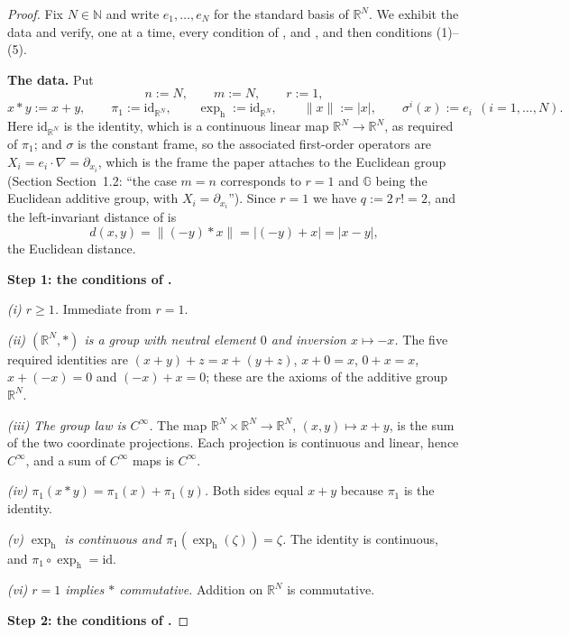 \begin{proof}
Fix $N\in\mathbb N$ and write $e_1,\ldots,e_N$ for the standard basis of $\mathbb R^N$. We
exhibit the data and verify, one at a time, every condition of ,
 and , and then conditions (1)--(5).

\medskip\noindent\textbf{The data.} Put
\[
 n:=N,\qquad m:=N,\qquad r:=1,
\]
\[
 x*y:=x+y,\qquad \pi_1:=\mathrm{id}_{\mathbb R^N},\qquad
 \exp_{\mathrm h}:=\mathrm{id}_{\mathbb R^N},\qquad \|x\|:=|x|,\qquad
 \sigma^i(x):=e_i\ \ (i=1,\ldots,N).
\]
Here $\mathrm{id}_{\mathbb R^N}$ is the identity, which is a continuous linear map
$\mathbb R^N\to\mathbb R^N$, as required of $\pi_1$; and $\sigma$ is the constant frame, so
the associated first-order operators are $X_i=e_i\cdot\nabla=\partial_{x_i}$, which is the
frame the paper attaches to the Euclidean group (Section Section~1.2: ``the case $m=n$
corresponds to $r=1$ and $\mathbb G$ being the Euclidean additive group, with
$X_i=\partial_{x_i}$''). Since $r=1$ we have $q:=2\,r!=2$, and the left-invariant distance
of  is
\[
 d(x,y)=\|(-y)*x\|=|(-y)+x|=|x-y| ,
\]
the Euclidean distance.

\medskip\noindent\textbf{Step 1: the conditions of .}

\emph{(i) $r\ge1$.} Immediate from $r=1$.

\emph{(ii) $(\mathbb R^N,*)$ is a group with neutral element $0$ and inversion
$x\mapsto-x$.} The five required identities are
$(x+y)+z=x+(y+z)$, $x+0=x$, $0+x=x$, $x+(-x)=0$ and $(-x)+x=0$; these are the axioms of the
additive group $\mathbb R^N$.

\emph{(iii) The group law is $C^\infty$.} The map
$\mathbb R^N\times\mathbb R^N\to\mathbb R^N$, $(x,y)\mapsto x+y$, is the sum of the two
coordinate projections. Each projection is continuous and linear, hence $C^\infty$, and a
sum of $C^\infty$ maps is $C^\infty$.

\emph{(iv) $\pi_1(x*y)=\pi_1(x)+\pi_1(y)$.} Both sides equal $x+y$ because $\pi_1$ is the
identity.

\emph{(v) $\exp_{\mathrm h}$ is continuous and $\pi_1(\exp_{\mathrm h}(\zeta))=\zeta$.} The
identity is continuous, and $\pi_1\circ\exp_{\mathrm h}=\mathrm{id}$.

\emph{(vi) $r=1$ implies $*$ commutative.} Addition on $\mathbb R^N$ is commutative.

\medskip\noindent\textbf{Step 2: the conditions of .}


\end{proof}
